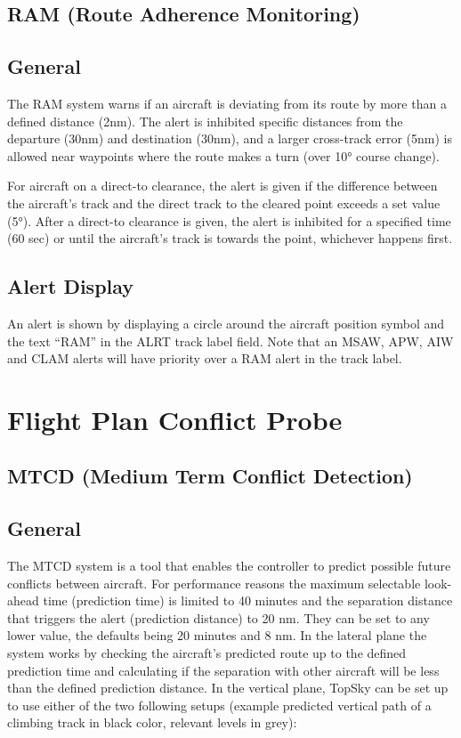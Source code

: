 \documentclass[11pt,a4paper]{memoir}
\begin{document}
\subsection{RAM (Route Adherence Monitoring)}

\subsection*{General}

The RAM system warns if an aircraft is deviating from its route by more than a defined distance (2nm). The alert is inhibited specific distances from the departure (30nm) and destination (30nm), and a larger cross-track error (5nm) is allowed near waypoints where the route makes a turn (over 10° course change).

For aircraft on a direct-to clearance, the alert is given if the difference between the aircraft’s track and the direct track to the cleared point exceeds a set value (5°). After a direct-to clearance is given, the alert is inhibited for a specified time (60 sec) or until the aircraft’s track is towards the point, whichever happens first.

\subsection*{Alert Display}

An alert is shown by displaying a circle around the aircraft position symbol and the text “RAM” in the ALRT track label field. Note that an MSAW, APW, AIW and CLAM alerts will have priority over a RAM alert in the track label.

\section{Flight Plan Conflict Probe}

\subsection{MTCD (Medium Term Conflict Detection)}

\subsection*{General}

The MTCD system is a tool that enables the controller to predict possible future conflicts between aircraft. For performance reasons the maximum selectable look-ahead time (prediction time) is limited to 40 minutes and the separation distance that triggers the alert (prediction distance) to 20 nm. They can be set to any lower value, the defaults being 20 minutes and 8 nm.
In the lateral plane the system works by checking the aircraft’s predicted route up to the defined prediction time and calculating if the separation with other aircraft will be less than the defined prediction distance.
In the vertical plane, TopSky can be set up to use either of the two following setups (example predicted vertical path of a climbing track in black color, relevant levels in grey):
\end{document}
